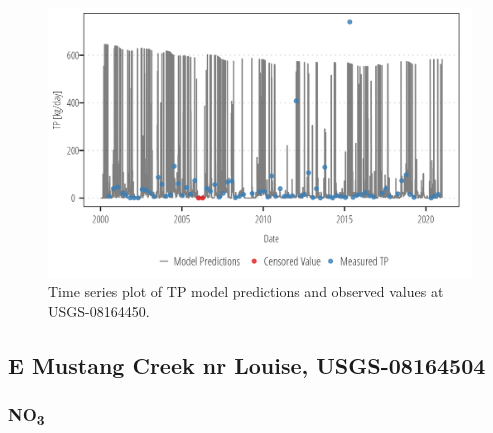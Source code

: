 \documentclass[
]{article}
\begin{document}
\begin{figure}[h]

{\centering \includegraphics{model_assessment_files/figure-pdf/unnamed-chunk-37-1.png}

}

\caption{Time series plot of TP model predictions and observed values at
USGS-08164450.}

\end{figure}

\clearpage

\hypertarget{e-mustang-creek-nr-louise-usgs-08164504}{%
\subsection{E Mustang Creek nr Louise,
USGS-08164504}\label{e-mustang-creek-nr-louise-usgs-08164504}}

\hypertarget{no3-2}{%
\subsubsection{\texorpdfstring{NO\textsubscript{3}}{NO3}}\label{no3-2}}
\end{document}
